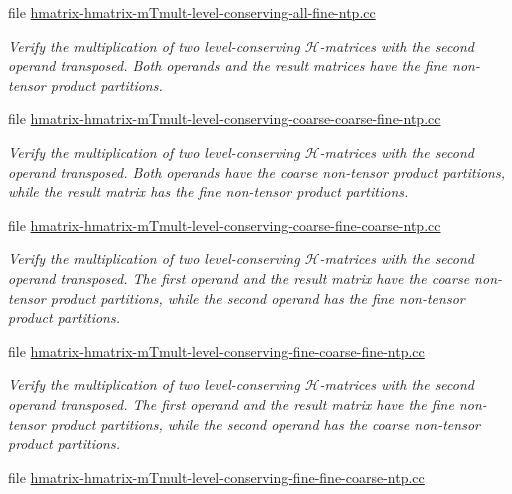\begin{DoxyCompactItemize}
file \hyperlink{hmatrix-hmatrix-mTmult-level-conserving-all-fine-ntp_8cc}{hmatrix-\/hmatrix-\/m\+Tmult-\/level-\/conserving-\/all-\/fine-\/ntp.\+cc}
\begin{DoxyCompactList}\small\item\em Verify the multiplication of two level-\/conserving $\mathcal{H}$-\/matrices with the second operand transposed. Both operands and the result matrices have the fine non-\/tensor product partitions. \end{DoxyCompactList}\item 
file \hyperlink{hmatrix-hmatrix-mTmult-level-conserving-coarse-coarse-fine-ntp_8cc}{hmatrix-\/hmatrix-\/m\+Tmult-\/level-\/conserving-\/coarse-\/coarse-\/fine-\/ntp.\+cc}
\begin{DoxyCompactList}\small\item\em Verify the multiplication of two level-\/conserving $\mathcal{H}$-\/matrices with the second operand transposed. Both operands have the coarse non-\/tensor product partitions, while the result matrix has the fine non-\/tensor product partitions. \end{DoxyCompactList}\item 
file \hyperlink{hmatrix-hmatrix-mTmult-level-conserving-coarse-fine-coarse-ntp_8cc}{hmatrix-\/hmatrix-\/m\+Tmult-\/level-\/conserving-\/coarse-\/fine-\/coarse-\/ntp.\+cc}
\begin{DoxyCompactList}\small\item\em Verify the multiplication of two level-\/conserving $\mathcal{H}$-\/matrices with the second operand transposed. The first operand and the result matrix have the coarse non-\/tensor product partitions, while the second operand has the fine non-\/tensor product partitions. \end{DoxyCompactList}\item 
file \hyperlink{hmatrix-hmatrix-mTmult-level-conserving-fine-coarse-fine-ntp_8cc}{hmatrix-\/hmatrix-\/m\+Tmult-\/level-\/conserving-\/fine-\/coarse-\/fine-\/ntp.\+cc}
\begin{DoxyCompactList}\small\item\em Verify the multiplication of two level-\/conserving $\mathcal{H}$-\/matrices with the second operand transposed. The first operand and the result matrix have the fine non-\/tensor product partitions, while the second operand has the coarse non-\/tensor product partitions. \end{DoxyCompactList}\item 
file \hyperlink{hmatrix-hmatrix-mTmult-level-conserving-fine-fine-coarse-ntp_8cc}{hmatrix-\/hmatrix-\/m\+Tmult-\/level-\/conserving-\/fine-\/fine-\/coarse-\/ntp.\+cc}

\end{DoxyCompactItemize}
